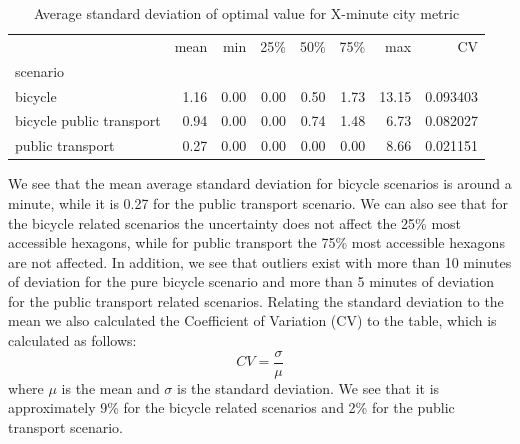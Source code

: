 \begin{table}
  \caption{Average standard deviation of optimal value for X-minute city metric}
  \label{tab:average_standard_deviation_of_optimal_value_for_x_minute_city_metric}
  \begin{center}
    \begin{tabular}{lrrrrrrr}
     & mean & min & 25\% & 50\% & 75\% & max & CV \\
    scenario &  &  &  &  &  &  &  \\
    bicycle & 1.16 & 0.00 & 0.00 & 0.50 & 1.73 & 13.15 & 0.093403 \\
    bicycle public transport & 0.94 & 0.00 & 0.00 & 0.74 & 1.48 & 6.73 & 0.082027 \\
    public transport & 0.27 & 0.00 & 0.00 & 0.00 & 0.00 & 8.66 & 0.021151 \\
    \end{tabular}
  \end{center}
\end{table}


We see that the mean average standard deviation for bicycle scenarios is around a minute, while it is 0.27 for the public transport scenario.
We can also see that for the bicycle related scenarios the uncertainty does not affect the 25\% most accessible hexagons, while for public transport the 75\% most accessible hexagons are not affected.
In addition, we see that outliers exist with more than 10 minutes of deviation for the pure bicycle scenario and more than 5 minutes of deviation for the public transport related scenarios.
Relating the standard deviation to the mean we also calculated the Coefficient of Variation (CV) to the table, which is calculated as follows:
$$ CV = \frac{\sigma}{\mu} $$
where $\mu$ is the mean and $\sigma$ is the standard deviation.
We see that it is approximately 9\% for the bicycle related scenarios and 2\% for the public transport scenario.

